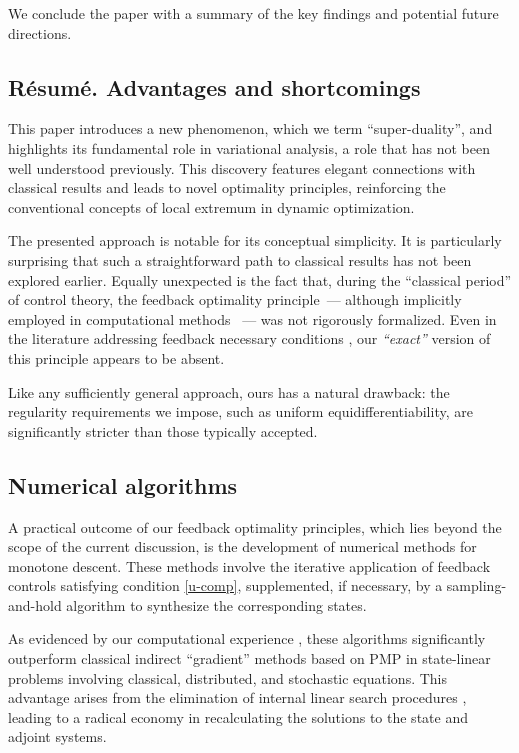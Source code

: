 \documentclass[sn-mathphys-num]{sn-jnl}
\DeclareRobustCommand{\nick}[1]{
\ifthenelse{\boolean{show_comments}}
{\begingroup\color{blue}{[\textbf{Nick:} #1]}\endgroup}
{}
}
\numberwithin{equation}{section}
\theoremstyle{mythm}
\theoremstyle{mydef}
\begin{document}
We conclude the paper with a summary of the key findings and potential future directions.

\subsection{R\'{e}sum\'{e}. Advantages and shortcomings}

This paper introduces a new phenomenon, which we term ``super-duality'', and highlights its fundamental role in variational analysis, a role that has not been well understood previously. This discovery features elegant connections with classical results and leads to novel optimality principles, reinforcing the conventional concepts of local extremum in dynamic optimization. 


The presented approach is notable for its conceptual simplicity. 
It is particularly surprising that such a straightforward path to classical results has not been explored earlier. Equally unexpected is the fact that, during the ``classical period'' of control theory, the feedback optimality principle~--- although implicitly employed in computational methods \cite{srochko1982computational}~--- was not rigorously formalized. Even in the literature addressing feedback necessary conditions \cite{Dykhta2014}, our \emph{``exact''} version of this principle appears to be absent.

Like any sufficiently general approach, ours has a natural drawback: the regularity requirements we impose, such as uniform equidifferentiability, are significantly stricter than those typically accepted.

\subsection{Numerical algorithms}

A practical outcome of our feedback optimality principles, which lies beyond the scope of the current discussion, is the development of numerical methods for monotone descent. These methods involve the iterative application of feedback controls satisfying condition \eqref{u-comp}, supplemented, if necessary, by a sampling-and-hold algorithm to synthesize the corresponding states.

As evidenced by our computational experience \cite{chertovskihOptimalControlDistributed2023,
chertovskihOptimalControlDiffusion2024}, these algorithms significantly outperform classical indirect ``gradient'' methods based on PMP in state-linear problems involving classical, distributed, and stochastic equations. This advantage arises from the elimination of internal linear search procedures%
, leading to a radical economy in recalculating the solutions to the state and adjoint systems.
\end{document}
